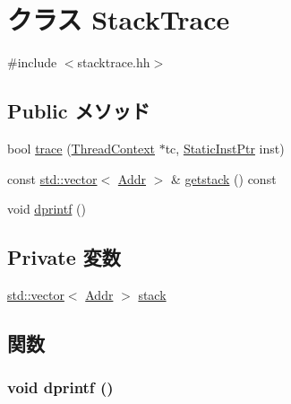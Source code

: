 \hypertarget{classSparcISA_1_1StackTrace}{
\section{クラス StackTrace}
\label{classSparcISA_1_1StackTrace}
}


{\ttfamily \#include $<$stacktrace.hh$>$}\subsection*{Public メソッド}
\begin{DoxyCompactItemize}
\item 
bool \hyperlink{classSparcISA_1_1StackTrace_aabb136846a5e22007e44db846652ddd5}{trace} (\hyperlink{classThreadContext}{ThreadContext} $\ast$tc, \hyperlink{classRefCountingPtr}{StaticInstPtr} inst)
\item 
const \hyperlink{classstd_1_1vector}{std::vector}$<$ \hyperlink{base_2types_8hh_af1bb03d6a4ee096394a6749f0a169232}{Addr} $>$ \& \hyperlink{classSparcISA_1_1StackTrace_aceb93ba31a3756aca859b4643efeeb46}{getstack} () const 
\item 
void \hyperlink{classSparcISA_1_1StackTrace_a70fdc8802b54b4244889a2d3553405d5}{dprintf} ()
\end{DoxyCompactItemize}
\subsection*{Private 変数}
\begin{DoxyCompactItemize}
\item 
\hyperlink{classstd_1_1vector}{std::vector}$<$ \hyperlink{base_2types_8hh_af1bb03d6a4ee096394a6749f0a169232}{Addr} $>$ \hyperlink{classSparcISA_1_1StackTrace_a8be39169db4f31c77f5188de23c602f1}{stack}
\end{DoxyCompactItemize}


\subsection{関数}
\hypertarget{classSparcISA_1_1StackTrace_a70fdc8802b54b4244889a2d3553405d5}{
\subsubsection[{dprintf}]{\setlength{\rightskip}{0pt plus 5cm}void dprintf ()}}
\label{classSparcISA_1_1StackTrace_a70fdc8802b54b4244889a2d3553405d5}



